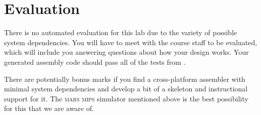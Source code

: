 \clearpage
\section{Evaluation}

There is no automated evaluation for this lab due to the variety of
possible system dependencies. You will have to meet with the course
staff to be evaluated, which will include you answering questions about
how your design works. Your generated assembly code should pass all of
the tests from .

There are potentially bonus marks if you find a cross-platform assembler
with minimal system dependencies and develop a bit of a skeleton and
instructional support for it. The \textsc{mars} \textsc{mips} simulator
mentioned above is the best possibility for this that we are aware of.

